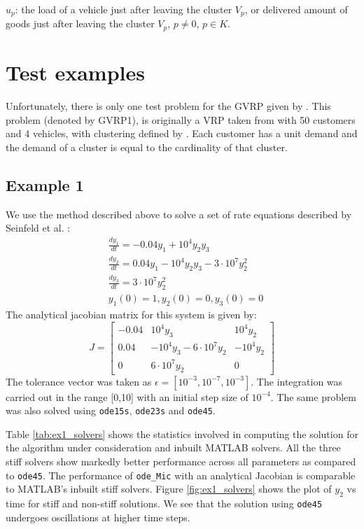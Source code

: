 \documentclass[letterpaper,12pt,onehalfspacing,twoside]{article}
\theoremstyle{msds}
\begin{document}
$u_{p}$: the load of a vehicle just after leaving the cluster $V_p$, or delivered amount of goods just after leaving the cluster $V_p$, $p \ne 0$, $p \in K$.








\section{Test examples}

Unfortunately, there is only one test problem for the GVRP given by \cite{GHIANI200011}. This problem (denoted by GVRP1), is originally a VRP taken from \cite{AraqueG1994} with 50 customers and 4 vehicles, with clustering defined by \cite{GHIANI200011}. Each customer has a unit demand and the demand of a cluster is equal to the cardinality of that cluster. 

\subsection{Example 1}
We use the method described above to solve a set of rate equations described by Seinfeld et al. \cite{seinfeld}:
\begin{equation}
\begin{aligned}
&\frac{dy_1}{dt} = - 0.04 y_1 + 10^4 y_2 y_3\\
&\frac{dy_2}{dt} = 0.04 y_1 - 10^4 y_2 y_3 - 3 \cdot 10^7 y_2^2\\
&\frac{dy_3}{dt} = 3\cdot 10^7 y_2^2\\
&y_1(0) = 1, y_2(0) = 0, y_3(0) = 0
\end{aligned}
\end{equation}
The analytical jacobian matrix for this system is given by:
\begin{equation*}
J =\begin{bmatrix}
    -0.04 & 10^4 y_3 & 10^4 y_2  \\
    0.04 & -10^4 y_3 - 6 \cdot 10^7 y_2 & -10^4 y_2 \\
    0 & 6 \cdot 10^7 y_2  & 0
\end{bmatrix}
\end{equation*}
The tolerance vector was taken as $\epsilon = [10^{-3},10^{-7},10^{-3}]$. The integration was carried out in the range [0,10] with an initial step size of $10^{-4}$. The same problem was also solved using \texttt{ode15s}, \texttt{ode23s} and \texttt{ode45}. 

Table \ref{tab:ex1_solvers} shows the statistics involved in computing the solution for the algorithm under consideration and inbuilt MATLAB solvers.  All the three stiff solvers show markedly better performance across all parameters as compared to \texttt{ode45}. The performance of \texttt{ode\_Mic} with an analytical Jacobian is comparable to MATLAB's inbuilt stiff solvers. 
Figure \ref{fig:ex1_solvers} shows the plot of $y_2$ vs time for stiff and non-stiff solutions. We see that the solution using \texttt{ode45} undergoes oscillations at higher time steps.
\end{document}
